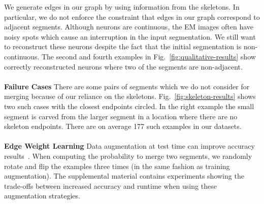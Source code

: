 We generate edges in our graph by using information from the skeletons. 
In particular, we do not enforce the constraint that edges in our graph correspond to adjacent segments.
Although neurons are continuous, the EM images often have noisy spots which cause an interruption in the input segmentation.
We still want to reconstruct these neurons despite the fact that the initial segmentation is non-continuous. 
The second and fourth examples in Fig.~\ref{fig:qualitative-results} show correctly reconstructed neurons where two of the segments are non-adjacent. 
\\~\\
\noindent\textbf{Failure Cases}
There are some pairs of segments which we do not consider for merging because of our reliance on the skeletons.
Fig.~\ref{fig:skeleton-results} shows two such cases with the closest endpoints circled. 
In the right example the small segment is carved from the larger segment in a location where there are no skeleton endpoints. 
There are on average 177 such examples in our datasets.
\\~\\
\noindent\textbf{Edge Weight Learning}
Data augmentation at test time can improve accuracy results~\cite{lee2017superhuman,zeng2017deepem3d}.
When computing the probability to merge two segments, we randomly rotate and flip the examples three times (in the same fashion as training augmentation).
The supplemental material contains experiments showing the trade-offs between increased accuracy and runtime when using these augmentation strategies.

